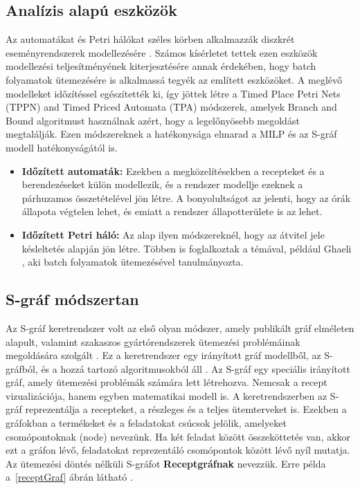 \subsection{Analízis alapú eszközök}
Az automatákat és Petri hálókat széles körben alkalmazzák diszkrét eseményrendszerek modellezésére \cite{cassandras}. Számos kísérletet tettek ezen eszközök modellezési teljesítményének kiterjesztésére annak érdekében, hogy batch folyamatok ütemezésére is alkalmassá tegyék az említett eszközöket. A meglévő modelleket időzítéssel egészítették ki, így jöttek létre a Timed Place Petri Nets (TPPN) and Timed Priced Automata (TPA) módszerek, amelyek Branch and Bound algoritmust használnak azért, hogy a legelőnyösebb megoldást megtalálják. Ezen módszereknek a hatékonysága elmarad a MILP és az S-gráf modell hatékonyságától is.
\begin{itemize}
	\item[] \textbf{Időzített automaták:} Ezekben a megközelítésekben a recepteket és a berendezéseket külön modellezik, és a rendszer modellje ezeknek a párhuzamos összetételével jön létre. A bonyolultságot az jelenti, hogy az órák állapota végtelen lehet, és emiatt a rendszer állapotterülete is az lehet.
	\item[] \textbf{Időzített Petri háló:} Az alap ilyen módszereknél, hogy az átvitel jele késleltetés alapján jön létre. Többen is foglalkoztak a témával, például Ghaeli \cite{ghaeli}, aki batch folyamatok ütemezésével tanulmányozta.
\end{itemize}

\subsection{S-gráf módszertan}
Az S-gráf keretrendszer volt az első olyan módszer, amely publikált gráf elméleten alapult, valamint szakaszos gyártórendszerek ütemezési problémáinak megoldására szolgált \cite{combtech}. Ez a keretrendszer egy irányított gráf modellből, az S-gráfból, és a hozzá tartozó algoritmusokból áll \cite{combframe}. Az S-gráf egy speciális irányított gráf, amely ütemezési problémák számára lett létrehozva. Nemcsak a recept vizualizációja, hanem egyben matematikai modell is. A keretrendszerben az S-gráf reprezentálja a recepteket, a részleges és a teljes ütemterveket is. Ezekben a gráfokban a termékeket és a feladatokat csúcsok jelölik, amelyeket csomópontoknak (node) nevezünk. Ha két feladat között összeköttetés van, akkor ezt a gráfon lévő, feladatokat reprezentáló csomópontok között lévő nyíl mutatja. Az ütemezési döntés nélküli S-gráfot \textbf{Receptgráfnak} nevezzük. Erre példa a~\ref{receptGraf} ábrán látható \cite{Hegyhati}. 

